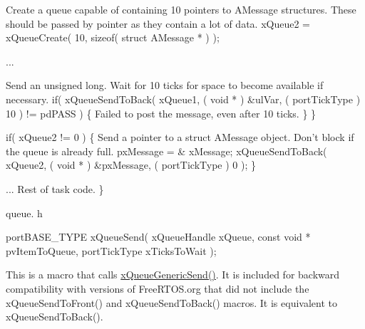 \begin{DoxyPre}Create a queue capable of containing 10 pointers to AMessage structures.
These should be passed by pointer as they contain a lot of data.
        xQueue2 = xQueueCreate( 10, sizeof( struct AMessage * ) );\end{DoxyPre}



\begin{DoxyPre}...
\begin{DoxyVerb}    if( xQueue1 != 0 )
    {
\end{DoxyVerb}

Send an unsigned long.  Wait for 10 ticks for space to become
available if necessary.
                if( xQueueSendToBack( xQueue1, ( void * ) \&ulVar, ( portTickType ) 10 ) != pdPASS )
                \{
Failed to post the message, even after 10 ticks.
                \}
        \}\end{DoxyPre}



\begin{DoxyPre}        if( xQueue2 != 0 )
        \{
Send a pointer to a struct AMessage object.  Don't block if the
queue is already full.
                pxMessage = \& xMessage;
                xQueueSendToBack( xQueue2, ( void * ) \&pxMessage, ( portTickType ) 0 );
        \}\end{DoxyPre}



\begin{DoxyPre}... Rest of task code.
 \}
 \end{DoxyPre}


queue. h 
\begin{DoxyPre}
 portBASE\_TYPE xQueueSend(
                                                          xQueueHandle xQueue,
                                                          const void * pvItemToQueue,
                                                          portTickType xTicksToWait
                                                 );
   \end{DoxyPre}


This is a macro that calls \hyperlink{_common_2_libraries_2_free_r_t_o_s_2_source_2include_2queue_8h_a20cce4e7bd234116d67ebcdbe4ef2f3a}{x\-Queue\-Generic\-Send()}. It is included for backward compatibility with versions of Free\-R\-T\-O\-S.\-org that did not include the x\-Queue\-Send\-To\-Front() and x\-Queue\-Send\-To\-Back() macros. It is equivalent to x\-Queue\-Send\-To\-Back().

